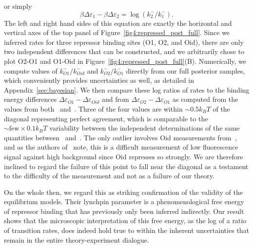 or simply
\begin{equation}
\beta\Delta\varepsilon_1 - \beta\Delta\varepsilon_2
= \log(k_2^-/k_1^-).
\end{equation}
The left and right hand sides of this equation are exactly the horizontal and
vertical axes of the top panel of Figure~\ref{fig4:repressed_post_full}. Since
we inferred rates for three repressor binding sites (O1, O2, and Oid), there are
only two independent differences that can be constructed, and we arbitrarily
chose to plot O2-O1 and O1-Oid in Figure~\ref{fig4:repressed_post_full}(B).
Numerically, we compute values of $k_{O1}^- / k_{Oid}^-$ and $k_{O2}^- /
k_{O1}^-$ directly from our full posterior samples, which conveniently provides
uncertainties as well, as detailed in Appendix~\ref{sec:bayesian}.
 We then compare these log ratios of rates to the
binding energy differences $\Delta\varepsilon_{O1} - \Delta\varepsilon_{Oid}$
and from $\Delta\varepsilon_{O2} - \Delta\varepsilon_{O1}$ as computed from the
values from both~\cite{Garcia2011a} and~\cite{Razo-Mejia2018}. Three of the four
values are within $\sim0.5 k_BT$ of the diagonal representing perfect agreement,
which is comparable to the $\sim\text{few}\times0.1 k_BT$ variability between
the independent determinations of the same quantities between~\cite{Garcia2011a}
and~\cite{Razo-Mejia2018}. The only outlier involves Oid measurements
from~\cite{Razo-Mejia2018}, and as the authors of~\cite{Razo-Mejia2018} note,
this is a difficult measurement of low fluorescence signal against high
background since Oid represses so strongly. We are therefore inclined to regard
the failure of this point to fall near the diagonal as a testament to the
difficulty of the measurement and not as a failure of our theory.

On the whole then, we regard this as striking confirmation of the validity of
the equilibrium models. Their lynchpin parameter is a phenomenological free
energy of repressor binding that has previously only been inferred indirectly.
Our result shows that the microscopic interpretation of this free energy, as the
log of a ratio of transition rates, does indeed hold true to within the inherent
uncertainties that remain in the entire theory-experiment dialogue.

